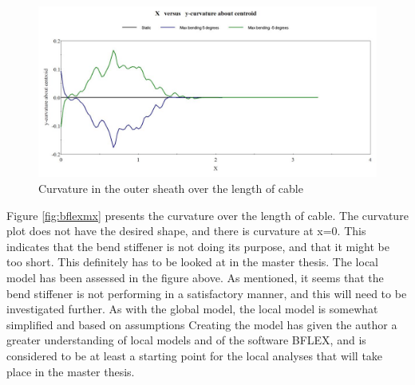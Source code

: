\begin{figure}[H]
\centering
\includegraphics[scale=0.75]{figures/bflexcurve}
\caption[$\; \:$Curvature in outer sheath]{Curvature in the outer sheath over the length of cable}
 \label{fig:bflexmz}
\end{figure}
\noindent Figure \ref{fig:bflexmx} presents the curvature over the length of cable. The curvature plot does not have the desired shape, and there is curvature at x=0. This indicates that the bend stiffener is not doing its purpose, and that it might be too short. This definitely has to be looked at in the master thesis. \newline
\newline
The local model has been assessed in the figure above. As mentioned, it seems that the bend stiffener is not performing in a satisfactory manner, and this will need to be investigated further. As with the global model, the local model is somewhat simplified and based on assumptions Creating the model has given the author a greater understanding of local models and of the software BFLEX, and is considered to be at least a starting point for the local analyses that will take place in the master thesis.   